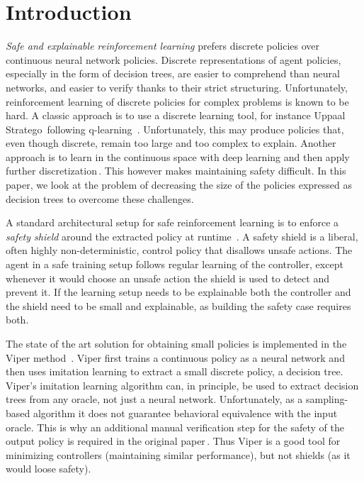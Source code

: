 \section {Introduction}%
\label {sec:introduction}

\noindent
\emph {Safe and explainable reinforcement learning} prefers discrete policies over continuous neural network policies.  Discrete representations of agent policies, especially in the form of decision trees, are easier to comprehend than neural networks, and easier to verify thanks to their strict structuring. Unfortunately, reinforcement learning of discrete policies for complex problems is known to be hard.  A classic approach is to use a discrete learning tool, for instance Uppaal Stratego\,\cite {DBLP:conf/tacas/DavidJLMT15} following q-learning~\cite {TODO}. Unfortunately, this may produce policies that, even though discrete, remain too large and too complex to explain.  Another approach is to learn in the continuous space  with deep learning \cite {TODO} and then apply further discretization\,\cite {DBLP:conf/nips/BastaniPS18}. This however makes maintaining safety difficult. In this paper, we look at the problem of decreasing the size of the policies expressed as decision trees to overcome these challenges.

A standard architectural setup for safe reinforcement learning is to enforce a \emph {safety shield} around the extracted policy at runtime~\cite{What-is-the-oldest-shield-paper}. A safety shield is a liberal, often highly non-deterministic, control policy that disallows unsafe actions. The agent in a safe training setup follows regular learning of the controller, except whenever it would choose an unsafe action the shield is used to detect and prevent it.  If the learning setup needs to be explainable both the controller and the shield need to be small and explainable, as building the safety case requires both.

The state of the art solution for obtaining small policies is implemented in the Viper method~\cite {DBLP:conf/nips/BastaniPS18}.  Viper first trains a continuous policy as a neural network and then uses imitation learning to extract a small discrete policy, a decision tree. Viper's imitation learning algorithm can, in principle, be used to extract decision trees from any oracle, not just a neural network.  Unfortunately, as a sampling-based algorithm it does not guarantee behavioral equivalence with the input oracle. This is why an additional manual verification step for the safety of the output policy is required in the original paper\,\cite {DBLP:conf/nips/BastaniPS18}. Thus Viper is a good tool for minimizing controllers (maintaining similar performance), but not shields (as it would loose safety).

